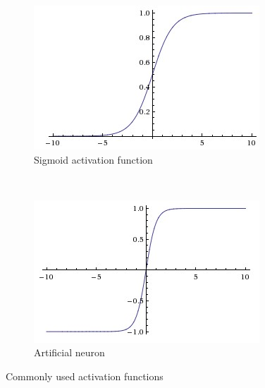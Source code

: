 \begin{figure}[ht!]
\centering
\begin{subfigure}[t]{0.5\textwidth}
\centering
\includegraphics[width=\linewidth]{Figures/sigmoid.jpeg}
\caption{Sigmoid activation function}
\end{subfigure}%
~ 
\begin{subfigure}[t]{0.5\textwidth}
\centering
\includegraphics[width=\linewidth]{Figures/tanh.jpeg}
\caption{Artificial neuron}
\end{subfigure}
\caption{Commonly used activation functions}
\label{activation}
\end{figure}

